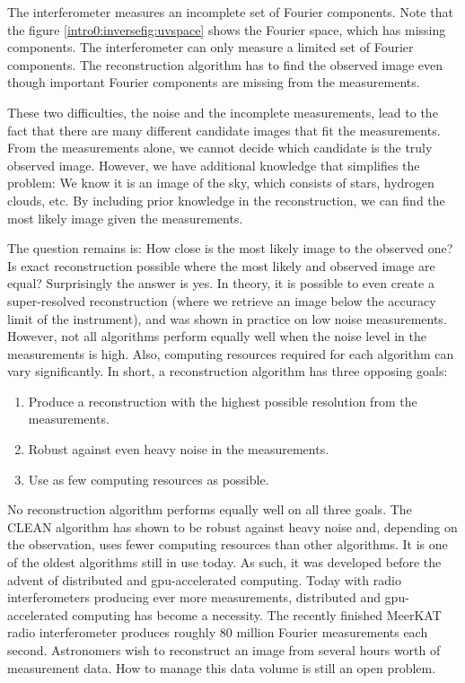 The interferometer measures an incomplete set of Fourier components. Note that the figure \ref{intro0:inversefig:uvspace} shows the Fourier space, which has missing components. The interferometer can only measure a limited set of Fourier components. The reconstruction algorithm has to find the observed image even though important Fourier components are missing from the measurements.

These two difficulties, the noise and the incomplete measurements, lead to the fact that there are many different candidate images that fit the measurements. From the measurements alone, we cannot decide which candidate is the truly observed image. However, we have additional knowledge that simplifies the problem: We know it is an image of the sky, which consists of stars, hydrogen clouds, etc. By including prior knowledge in the reconstruction, we can find the most likely image given the measurements. 

The question remains is: How close is the most likely image to the observed one? Is exact reconstruction possible where the most likely and observed image are equal? Surprisingly the answer is yes. In theory, it is possible to even create a super-resolved reconstruction (where we retrieve an image below the accuracy limit of the instrument)\cite{candes2006robust,donoho2006compressed}, and was shown in practice on low noise measurements\cite{dabbech2018cygnus, dabbech2015moresane}. However, not all algorithms perform equally well when the noise level in the measurements is high. Also, computing resources required for each algorithm can vary significantly. In short, a reconstruction algorithm has three opposing goals:
\begin{enumerate}
	\item Produce a reconstruction with the highest possible resolution from the measurements.
	\item Robust against even heavy noise in the measurements.
	\item Use as few computing resources as possible.
\end{enumerate}

No reconstruction algorithm performs equally well on all three goals. The CLEAN algorithm\cite{hogbom1974aperture, rau2011multi} has shown to be robust against heavy noise and, depending on the observation, uses fewer computing resources than other algorithms\cite{offringa2017optimized}. It is one of the oldest algorithms still in use today. As such, it was developed before the advent of distributed and gpu-accelerated computing. Today with radio interferometers producing ever more measurements, distributed and gpu-accelerated computing has become a necessity. The recently finished MeerKAT radio interferometer produces roughly 80 million Fourier measurements each second. Astronomers wish to reconstruct an image from several hours worth of measurement data. How to manage this data volume is still an open problem.

